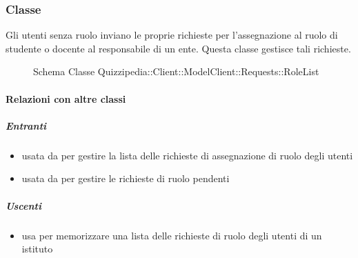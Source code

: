 \subsubsection{Classe }
Gli utenti senza ruolo inviano le proprie richieste per l'assegnazione al ruolo di studente o docente al responsabile di un ente. Questa classe gestisce tali richieste.
\begin{figure}[H]
\centering
\noindent{}
\caption[Schema Classe RoleList]{Schema Classe Quizzipedia::Client::ModelClient::Requests::RoleList}
\end{figure}
\paragraph{Relazioni con altre classi}
\subparagraph{Entranti}
\begin{itemize}
\item usata da  per gestire la lista delle richieste di assegnazione di ruolo degli utenti
\item usata da  per gestire le richieste di ruolo pendenti
\end{itemize}
\subparagraph{Uscenti}
\begin{itemize}
\item usa  per memorizzare una lista delle richieste di ruolo degli utenti di un istituto
\end{itemize}
